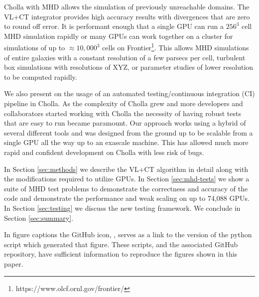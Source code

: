 Cholla with MHD allows the simulation of previously unreachable domains. The VL+CT integrator provides high accuracy results with divergences that are zero to round off error. It is performant enough that a single GPU can run a $256^3$ cell MHD simulation rapidly or many GPUs can work together on a cluster for simulations of up to $\approx 10,000^3$ cells on Frontier\footnote{https://www.olcf.ornl.gov/frontier/}. This allows MHD simulations of entire galaxies with a constant resolution of a few parsecs per cell, turbulent box simulations with resolutions of XYZ, or parameter studies of lower resolution to be computed rapidly.

We also present on the usage of an automated testing/continuous integration (CI) pipeline in Cholla. As the complexity of Cholla grew and more developers and collaborators started working with Cholla the necessity of having robust tests that are easy to run became paramount. Our approach works using a hybrid of several different tools and was designed from the ground up to be scalable from a single GPU all the way up to an exascale machine. This has allowed much more rapid and confident development on Cholla with less risk of bugs.

In Section \ref{sec:methods} we describe the VL+CT algorithm in detail along with the modifications required to utilize GPUs. 
In Section \ref{sec:mhd-tests} we show a suite of MHD test problems to demonstrate the correctness and accuracy of the code and demonstrate the performance and weak scaling on up to 74,088 GPUs.
In Section \ref{sec:testing} we discuss the new testing framework. 
We conclude in Section \ref{sec:summary}. 

In figure captions the GitHub icon, , serves as a link to the version of the python script which generated that figure. These scripts, and the associated GitHub repository, have sufficient information to reproduce the figures shown in this paper.